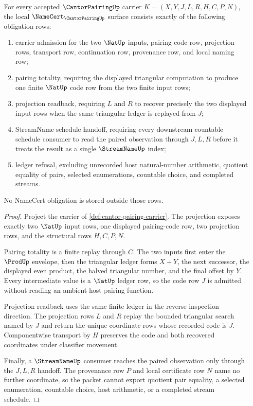 \begin{theorem}
\label{thm:cantor-pairing-namecert-obligations}
For every accepted $\CantorPairingUp$ carrier $K=(X,Y,J,L,R,H,C,P,N)$, the local $\NameCert_{\CantorPairingUp}$ surface consists exactly of the following obligation rows:
\begin{enumerate}
\item carrier admission for the two $\NatUp$ inputs, pairing-code row, projection rows, transport row, continuation row, provenance row, and local naming row;
\item pairing totality, requiring the displayed triangular computation to produce one finite $\NatUp$ code row from the two finite input rows;
\item projection readback, requiring $L$ and $R$ to recover precisely the two displayed input rows when the same triangular ledger is replayed from $J$;
\item StreamName schedule handoff, requiring every downstream countable schedule consumer to read the paired observation through $J,L,R$ before it treats the result as a single $\StreamNameUp$ index;
\item ledger refusal, excluding unrecorded host natural-number arithmetic, quotient equality of pairs, selected enumerations, countable choice, and completed streams.
\end{enumerate}
No NameCert obligation is stored outside those rows.
\end{theorem}
\begin{proof}
Project the carrier of \autoref{def:cantor-pairing-carrier}. The projection exposes exactly two $\NatUp$ input rows, one displayed pairing-code row, two projection rows, and the structural rows $H,C,P,N$.

Pairing totality is a finite replay through $C$. The two inputs first enter the $\ProdUp$ envelope, then the triangular ledger forms $X+Y$, the next successor, the displayed even product, the halved triangular number, and the final offset by $Y$. Every intermediate value is a $\NatUp$ ledger row, so the code row $J$ is admitted without reading an ambient host pairing function.

Projection readback uses the same finite ledger in the reverse inspection direction. The projection rows $L$ and $R$ replay the bounded triangular search named by $J$ and return the unique coordinate rows whose recorded code is $J$. Componentwise transport by $H$ preserves the code and both recovered coordinates under classifier movement.

Finally, a $\StreamNameUp$ consumer reaches the paired observation only through the $J,L,R$ handoff. The provenance row $P$ and local certificate row $N$ name no further coordinate, so the packet cannot export quotient pair equality, a selected enumeration, countable choice, host arithmetic, or a completed stream schedule.
\end{proof}


